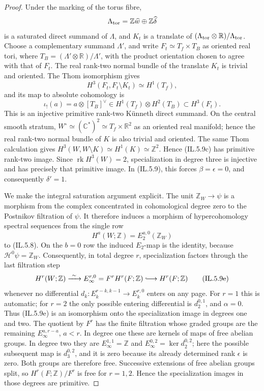 \begin{proof}
Under the marking of the torus fibre,
\[
 \Lambda_{\rm tor}=\mathbb Z\widehat w\oplus
                    \mathbb Z\widehat\delta
\]
is a saturated direct summand of \(\Lambda\), and \(K_t\) is a translate of
\((\Lambda_{\rm tor}\otimes\mathbb R)/\Lambda_{\rm tor}\).  Choose a
complementary summand \(\Lambda'\), and write
\(F_t\simeq T_f\times T_B\) as oriented real tori, where
\(T_B=(\Lambda'\otimes\mathbb R)/\Lambda'\), with the product orientation
chosen to agree with that of \(F_t\).  The real rank-two normal bundle of
the translate \(K_t\) is trivial and oriented.  The Thom isomorphism gives
\[
H^3(F_t,F_t\setminus K_t)\simeq H^1(T_f),
\]
and its map to absolute cohomology is
\[
 \iota_!(a)=a\otimes[T_B]^\vee
 \in H^1(T_f)\otimes H^2(T_B)\subset H^3(F_t).
\tag{IL.5.9d}
\]
This is an injective primitive rank-two K\"unneth direct summand.  On the
central smooth stratum,
\(W^\circ\simeq(\mathbb C^*)^2\simeq T_f\times\mathbb R^2\) as an
oriented real manifold; hence the real rank-two normal bundle of \(K\) is
also trivial and oriented.  The same Thom calculation gives
\(H^3(W,W\setminus K)\simeq H^1(K)\simeq\mathbb Z^2\).
Hence (IL.5.9c) has primitive rank-two image.  Since
\(\operatorname{rk}H^3(W)=2\), specialization in degree three is injective
and has precisely that primitive image.  In (IL.5.9), this forces
\(\beta=\epsilon=0\), and consequently \(\delta'=1\).

We make the integral saturation argument explicit.  The unit
\(\mathbb Z_W\to\psi\) is a morphism from the complex concentrated in
cohomological degree zero to the Postnikov filtration of \(\psi\).  It
therefore induces a morphism of hypercohomology spectral sequences from the
single row
\[
 H^a(W;\mathbb Z)=E_2^{a,0}(\mathbb Z_W)
\]
to (IL.5.8).  On the \(b=0\) row the induced \(E_2\)-map is the identity,
because \(\mathcal H^0\psi=\mathbb Z_W\).  Consequently, in total degree
\(r\), specialization factors through the last filtration step
\[
 H^r(W;\mathbb Z)\xrightarrow{\ \sim\ }
 E_\infty^{r,0}=F^rH^r(F;\mathbb Z)
 \lhook\joinrel\longrightarrow H^r(F;\mathbb Z)
 \tag{IL.5.9e}
\]
whenever no differential
\(d_k:E_k^{r-k,k-1}\to E_k^{r,0}\) enters on any page.  For \(r=1\) this
is automatic; for \(r=2\) the only possible entering differential is
\(d_2^{0,1}\), and \(\alpha=0\).  Thus (IL.5.9e) is an isomorphism onto the
specialization image in degrees one and two.  The quotient by \(F^r\) has
the finite filtration whose graded groups are the remaining
\(E_\infty^{a,r-a}\), \(a<r\).  In degree one these are kernels of maps of
free abelian groups.  In degree two they are
\(E_\infty^{1,1}=\mathbb Z\) and
\(E_\infty^{0,2}=\ker d_2^{0,2}\); here the possible subsequent map is
\(d_3^{0,2}\), and it is zero because its already determined rank
\(\epsilon\) is zero.  Both groups are therefore free.  Successive extensions of
free abelian groups split, so \(H^r(F;\mathbb Z)/F^r\) is free for
\(r=1,2\).  Hence the specialization images in those degrees are
primitive.


\end{proof}
